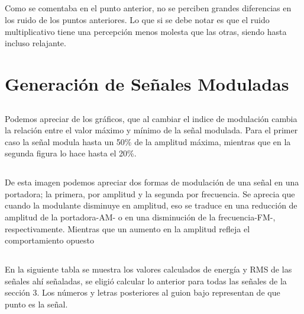 \documentclass[11pt, letterpaper, titlepage]{article}
\begin{document}
\subsection{}
Como se comentaba en el punto anterior, no se perciben grandes diferencias en los ruido de los puntos anteriores. Lo que si se debe notar es que el ruido multiplicativo tiene una percepción menos molesta que las otras, siendo hasta incluso relajante.
\section{Generación de Señales Moduladas}
\subsection{}

\hspace{3cm}


Podemos apreciar de los gráficos, que al cambiar el indice de modulación cambia la relación entre el valor máximo y mínimo de la señal modulada. Para el primer caso la señal modula hasta un 50\% de la amplitud máxima, mientras que en la segunda figura lo hace hasta el 20\%.

\subsection{}
\subsection{}
De esta imagen podemos apreciar dos formas de modulación de una señal en una portadora; la primera, por amplitud y la segunda por frecuencia. Se aprecia que cuando la modulante disminuye en amplitud, eso se traduce en una reducción de amplitud de la portadora-AM- o en una disminución de la frecuencia-FM-, respectivamente. Mientras que un aumento en la amplitud refleja el comportamiento opuesto
\subsection{}
En la siguiente tabla se muestra los valores calculados de energía y RMS de las señales ahí señaladas, se eligió calcular lo anterior para todas las señales de la sección 3. Los números y letras posteriores al guion bajo representan de que punto es la señal.
\newpage
\setcounter{section}{0}
\end{document}
